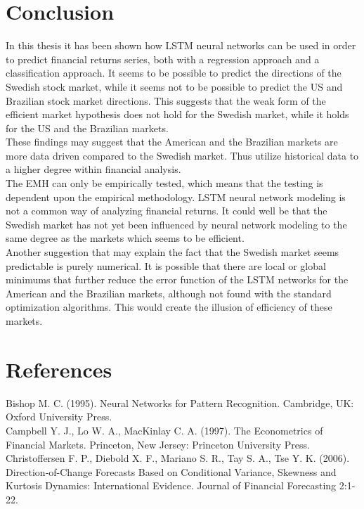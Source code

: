 \documentclass[12pt, letterpaper]{amsart}%
\begin{document}
\section{Conclusion}
In this thesis it has been shown how LSTM neural networks can be used in order to predict financial returns series, both with a regression approach and a classification approach. It seems to be possible to predict the directions of the Swedish stock market, while it seems not to be possible to predict the US and Brazilian stock market directions. This suggests that the weak form of the efficient market hypothesis does not hold for the Swedish market, while it holds for the US and the Brazilian markets.
\\

These findings may suggest that the American and the Brazilian markets are more data driven compared to the Swedish market. Thus utilize historical data to a higher degree within financial analysis.
\\

The EMH can only be empirically tested, which means that the testing is dependent upon the empirical methodology. LSTM neural network modeling is not a common way of analyzing financial returns. It could well be that the Swedish market has not yet been influenced by neural network modeling to the same degree as the markets which seems to be efficient.
\\

Another suggestion that may explain the fact that the Swedish market seems predictable is purely numerical. It is possible that there are local or global minimums that further reduce the error function of the LSTM networks for the American and the Brazilian markets, although not found with the standard optimization algorithms. This would create the illusion of efficiency of these markets.

\newpage

\section{References}
Bishop M. C. (1995). Neural Networks for Pattern Recognition. Cambridge, UK: Oxford University Press.
\\

Campbell Y. J., Lo W. A., MacKinlay C. A. (1997). The Econometrics of Financial Markets. Princeton, New Jersey: Princeton University Press.
\\

Christoffersen F. P., Diebold X. F., Mariano S. R., Tay S. A., Tse Y. K. (2006). Direction-of-Change Forecasts Based on Conditional Variance, Skewness and Kurtosis Dynamics: International Evidence. Journal of Financial Forecasting 2:1-22.
\\
\end{document}
